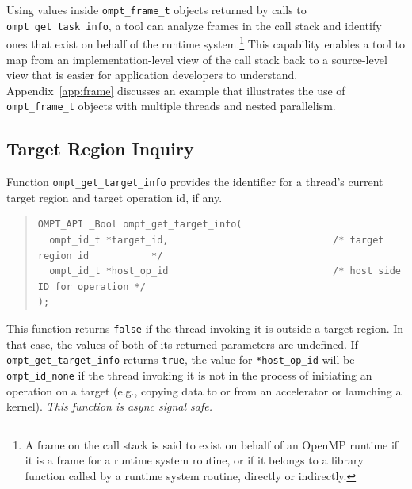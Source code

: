 \documentclass{article}
\begin{document}

Using values inside  \verb|ompt_frame_t| objects returned by calls to  \verb|ompt_get_task_info|, a tool can analyze  frames in the call stack and identify ones that exist on behalf of the runtime system.\footnote{A frame on the call stack is said to exist on behalf of an OpenMP runtime if it is a frame for a runtime system routine, or if it belongs to a library function called by a runtime system routine, directly or indirectly.} 
This capability enables a tool to map from an implementation-level view of the call stack back to a source-level view that is easier for application developers to understand. 
Appendix~\ref{app:frame} discusses  an example that illustrates the use of \verb|ompt_frame_t| objects with multiple threads and nested parallelism.

\subsection{Target Region Inquiry}
\label{sec:target-region}

Function \verb|ompt_get_target_info| provides the identifier for a thread's current target region and target operation id, if any.
\begin{quote}
\begin{verbatim}
OMPT_API _Bool ompt_get_target_info(
  ompt_id_t *target_id,                             /* target region id           */
  ompt_id_t *host_op_id                             /* host side ID for operation */
);
\end{verbatim}
\end{quote}
This function returns \verb|false| if the thread invoking it is
outside a target region. In that case, the values of both of its
returned parameters are undefined. If \verb|ompt_get_target_info|
returns \verb|true|, the value for \verb|*host_op_id| will be
\verb|ompt_id_none| if the thread invoking it is not in the process of initiating an operation on a target (e.g., copying data to or from an accelerator or launching a kernel).  {\em This function is async signal safe.}
\end{document}
